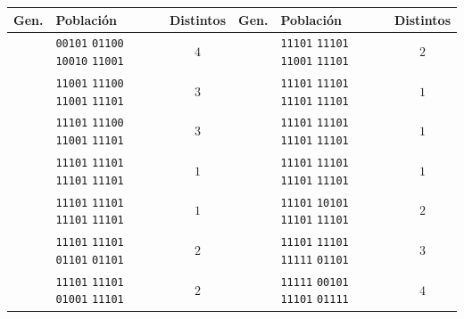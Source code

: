 \begin{table}[H]
\centering
\footnotesize
\setlength{\tabcolsep}{3pt}
\renewcommand{\arraystretch}{1.15}
\begin{tabular}{|c|l|c|c|l|c|}
\hline
\rowcolor{encabezado}\textbf{Gen.} & \textbf{Población} & \textbf{Distintos} & \textbf{Gen.} & \textbf{Población} & \textbf{Distintos} \\
\hline
\cellcolor{destacado}{\bfseries\boldmath $0$} & \cellcolor{destacado}\texttt{00101} \texttt{01100} \texttt{10010} \texttt{11001} & \cellcolor{destacado}$4$ & \cellcolor{iteracion}{\bfseries\boldmath $11$} & \texttt{11101} \texttt{11101} \texttt{11001} \texttt{11101} & $2$ \\
\hline
\cellcolor{iteracion}{\bfseries\boldmath $1$} & \cellcolor{cebra}\texttt{11001} \texttt{11100} \texttt{11001} \texttt{11101} & \cellcolor{cebra}$3$ & \cellcolor{iteracion}{\bfseries\boldmath $12$} & \cellcolor{cebra}\texttt{11101} \texttt{11101} \texttt{11101} \texttt{11101} & \cellcolor{cebra}$1$ \\
\hline
\cellcolor{iteracion}{\bfseries\boldmath $2$} & \texttt{11101} \texttt{11100} \texttt{11001} \texttt{11101} & $3$ & \cellcolor{iteracion}{\bfseries\boldmath $13$} & \texttt{11101} \texttt{11101} \texttt{11101} \texttt{11101} & $1$ \\
\hline
\cellcolor{iteracion}{\bfseries\boldmath $3$} & \cellcolor{cebra}\texttt{11101} \texttt{11101} \texttt{11101} \texttt{11101} & \cellcolor{cebra}$1$ & \cellcolor{iteracion}{\bfseries\boldmath $14$} & \cellcolor{cebra}\texttt{11101} \texttt{11101} \texttt{11101} \texttt{11101} & \cellcolor{cebra}$1$ \\
\hline
\cellcolor{iteracion}{\bfseries\boldmath $4$} & \texttt{11101} \texttt{11101} \texttt{11101} \texttt{11101} & $1$ & \cellcolor{iteracion}{\bfseries\boldmath $15$} & \texttt{11101} \texttt{10101} \texttt{11101} \texttt{11101} & $2$ \\
\hline
\cellcolor{iteracion}{\bfseries\boldmath $5$} & \cellcolor{cebra}\texttt{11101} \texttt{11101} \texttt{01101} \texttt{01101} & \cellcolor{cebra}$2$ & \cellcolor{destacado}{\bfseries\boldmath $16$} & \cellcolor{destacado}\texttt{11101} \texttt{11101} \texttt{11111} \texttt{01101} & \cellcolor{destacado}$3$ \\
\hline
\cellcolor{iteracion}{\bfseries\boldmath $6$} & \texttt{11101} \texttt{11101} \texttt{01001} \texttt{11101} & $2$ & \cellcolor{iteracion}{\bfseries\boldmath $17$} & \texttt{11111} \texttt{00101} \texttt{11101} \texttt{01111} & $4$ \\

\end{tabular}
\end{table}
